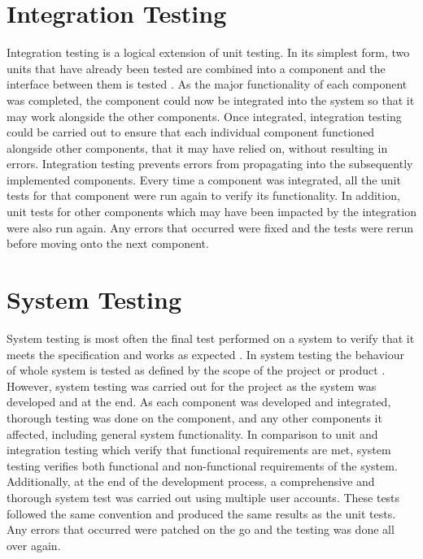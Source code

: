 \begin{longtabu}
\caption{Unit testing}
\label{tab:unit-testing}
\end{longtabu}

\section{Integration Testing}
Integration testing is a logical extension of unit testing. In its simplest form, two units that have already been tested are combined into a component and the interface between them is tested \cite{MSDN:IntegrationTesting}. As the major functionality of each component was completed, the component could now be integrated into the system so that it may work alongside the other components. Once integrated, integration testing could be carried out to ensure that each individual component functioned alongside other components, that it may have relied on, without resulting in errors. Integration testing prevents errors from propagating into the subsequently implemented components. Every time a component was integrated, all the unit tests for that component were run again to verify its functionality. In addition, unit tests for other components which may have been impacted by the integration were also run again. Any errors that occurred were fixed and the tests were rerun before moving onto the next component.

\section{System Testing}
System testing is most often the final test performed on a system to verify that it meets the specification and works as expected \cite{ISTQB:SystemTesting}. In system testing the behaviour of whole system is tested as defined by the scope of the project or product \cite{ISTQB:SystemTesting}. However, system testing was carried out for the project as the system was developed and at the end. As each component was developed and integrated, thorough testing was done on the component, and any other components it affected, including general system functionality. In comparison to unit and integration testing which verify that functional requirements are met, system testing verifies both functional and non-functional requirements of the system. Additionally, at the end of the development process, a comprehensive and thorough system test was carried out using multiple user accounts. These tests followed the same convention and produced the same results as the unit tests. Any errors that occurred were patched on the go and the testing was done all over again.

